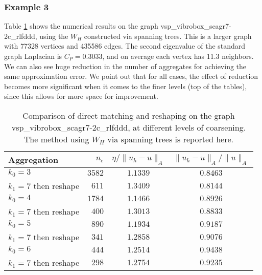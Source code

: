 \documentclass[ ]{elsarticle}
\newcommand{\esp}{W}
\numberwithin{equation}{section}
\begin{document}
\subsubsection*{\textbf{Example 3}}
Table \ref{tab:reshaping-vsp} shows the numerical results on the graph
vsp\_vibrobox\_scagr7-2c\_rlfddd, using the $\esp_H$ constructed via
spanning trees. This is a larger graph with 77328 vertices and 435586
edges. The second eigenvalue of the standard graph Laplacian is
$C_P=0.3033$, and on average each vertex has 11.3 neighbors. We can
also see huge reduction in the number of aggregates for achieving the
same approximation error. We point out that for all cases, the effect
of reduction becomes more significant when it comes to the finer
levels (top of the tables), since this allows for more space for
improvement.

\begin{table}
  \centering
  \begin{tabular}{l|r|c|c}
    Aggregation           & $n_c$   & $\eta/\lVert u_h-u\rVert_A$  & $\lVert u_h-u\rVert_A/\lVert u\rVert_A$ \\\hline
    $k_0=3$               & $3582$  & $1.1339$                     & $0.8463$                      \\
    $k_1=7$ then reshape  & $611$   & $1.3409$                     & $0.8144$                      \\\hline
    $k_0=4$               & $1784$  & $1.1466$                     & $0.8926$                      \\
    $k_1=7$ then reshape  & $400$   & $1.3013$                     & $0.8833$                      \\\hline
    $k_0=5$               & $890$   & $1.1934$                     & $0.9187$                      \\
    $k_1=7$ then reshape  & $341$   & $1.2858$                     & $0.9076$                      \\\hline
    $k_0=6$               & $444$   & $1.2514$                     & $0.9438$                      \\
    $k_1=7$ then reshape  & $298$   & $1.2754$                     & $0.9235$                      \\\hline
  \end{tabular}
  \caption{Comparison of direct matching and reshaping on the graph
    vsp\_vibrobox\_scagr7-2c\_rlfddd, at different levels of
    coarsening. The method using $\esp_H$ via spanning trees is
    reported here.}
  \label{tab:reshaping-vsp}
\end{table}
\end{document}

